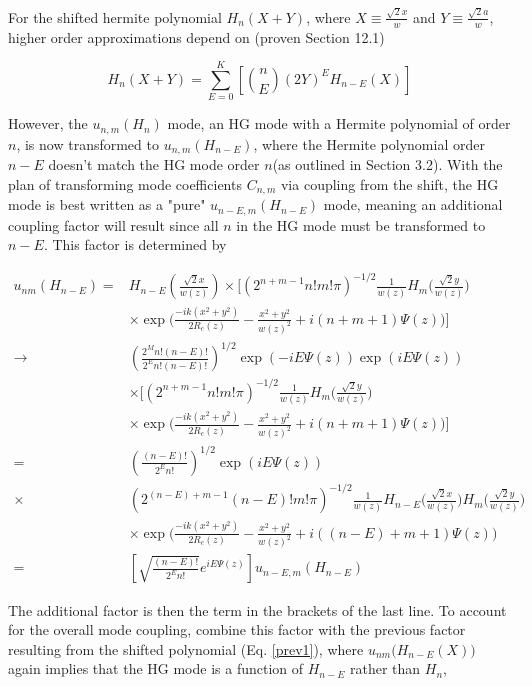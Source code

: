 \documentclass[aps,twoside,secnumarabic,balancelastpage,amsmath,amssymb,nofootinbib,hyperref=pdftex]{revtex4}
\begin{document}
For the shifted hermite polynomial $H_n(X+Y)$, where $X \equiv \frac{\sqrt{2}x}{w}$ and $Y \equiv \frac{\sqrt{2}a}{w}$, higher order approximations depend on (proven Section 12.1)

\begin{equation}\label{prev1}
H_n(X+Y)
= 
\sum_{E=0}^K
\left[
{n \choose E}
(2Y)^E
H_{n-E}(X)
\right]
\end{equation}

However, the $u_{n,m}(H_n)$ mode, an HG mode with a Hermite polynomial of order $n$, is now transformed to $u_{n,m}(H_{n-E})$, where the Hermite polynomial order $n-E$ doesn't match the HG mode order $n$(as outlined in Section 3.2). With the plan of transforming mode coefficients $C_{n,m}$ via coupling from the shift, the HG mode is best written as a "pure" $u_{n-E,m}(H_{n-E})$ mode, meaning an additional coupling factor will result since all $n$ in the HG mode must be transformed to $n-E$. This factor is determined by 

\begin{align*}
	u_{nm} (H_{n-E}) = &
	H_{n-E}(\frac{\sqrt{2}x}{w(z)})
	\times
	[
	(2^{n+m-1}n!m!\pi)^{-1/2}
		\frac{1}{w(z)}
		H_{m} \Big(\frac{\sqrt{2}y}{w(z)} \Big)
	\\& \times		
		\exp \Big(\frac{-ik(x^{2}+y^{2})}{2R_{c}(z)}-
		\frac{x^{2}+y^{2}}{w(z)^{2}} 
		+i(n+m+1)\Psi(z)		
		\Big)
				]
	\\ \rightarrow &
	(\frac{2^M n! (n-E)! }{2^E n!(n-E)!})^{1/2}
			\exp(-iE \Psi(z))\exp(iE \Psi(z))
			\\& \times
	[
	(2^{n+m-1}n!m!\pi)^{-1/2}
		\frac{1}{w(z)}
		H_{m} \Big(\frac{\sqrt{2}y}{w(z)} \Big)
	\\& \times		
		\exp \Big(\frac{-ik(x^{2}+y^{2})}{2R_{c}(z)}-
		\frac{x^{2}+y^{2}}{w(z)^{2}} 
		+i(n+m+1)\Psi(z)		
		\Big)
				]
		\\=&
		(\frac{(n-E)!}{2^E n!}) ^{1/2}
		\exp(i E\Psi(z))
		\\ \times&
			(2^{(n-E)+m-1}(n-E)!m!\pi)^{-1/2}
		\frac{1}{w(z)}
		H_{n-E} \Big(\frac{\sqrt{2}x}{w(z)} \Big)
		H_{m} \Big(\frac{\sqrt{2}y}{w(z)} \Big)
			\\& \times	
		\exp \Big(\frac{-ik(x^{2}+y^{2})}{2R_{c}(z)}-
		\frac{x^{2}+y^{2}}{w(z)^{2}} 
		+i( (n-E)+m+1)\Psi(z)			
		\Big)
		\\=&
		\left[
		\sqrt{\frac{(n-E)!}{2^E n!}}
		e^{i E \Psi(z)}
		\right]
		u_{n-E,m}(H_{n-E})
\end{align*}

The additional factor is then the term in the brackets of the last line. To account for the overall mode coupling, combine this factor with the previous factor resulting from the shifted polynomial (Eq. \ref{prev1}), where $u_{nm}\Big(H_{n-E}(X) \Big) $ again implies that the HG mode is a function of $H_{n-E}$ rather than $H_{n}$,
\end{document}
